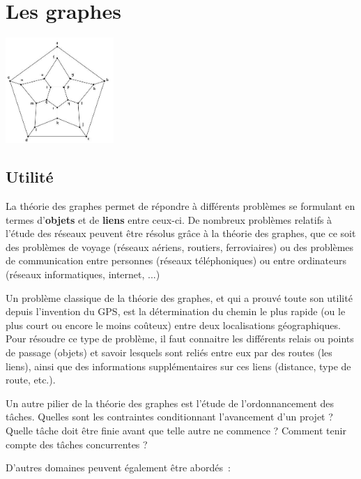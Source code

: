 \chapter{Les graphes}

\begin{center}
\includegraphics[width=4.092cm,height=3.999cm]{image/a2012Logique2eme-img041.jpg}
\end{center}
	

\section{Utilité}

	La théorie des graphes permet de répondre à différents 
	problèmes se formulant en termes d'\textbf{objets} et de
	\textbf{liens} entre ceux-ci. De nombreux problèmes relatifs 
	à l'étude des réseaux peuvent être résolus grâce à la
	théorie des graphes, que ce soit des problèmes de voyage 
	(réseaux aériens, routiers, ferroviaires) ou des problèmes de
	communication entre personnes (réseaux téléphoniques) 
	ou entre ordinateurs (réseaux informatiques, internet, ...)

	Un problème classique de la théorie des graphes, et qui a 
	prouvé toute son utilité depuis l'invention du GPS, est la
	détermination du chemin le plus rapide (ou le plus court 
	ou encore le moins coûteux) entre deux localisations
	géographiques. Pour résoudre ce type de problème, il faut 
	connaitre les différents relais ou points de passage (objets)
	et savoir lesquels sont reliés entre eux par des routes 
	(les liens), ainsi que des informations supplémentaires sur ces
	liens (distance, type de route, etc.).

	Un autre pilier de la théorie des graphes est l'étude de 
	l'ordonnancement des tâches. Quelles sont les contraintes
	conditionnant l'avancement d'un projet ? Quelle tâche doit 
	être finie avant que telle autre ne commence ? Comment tenir
	compte des tâches concurrentes ?

	D'autres domaines peuvent également être abordés~:

